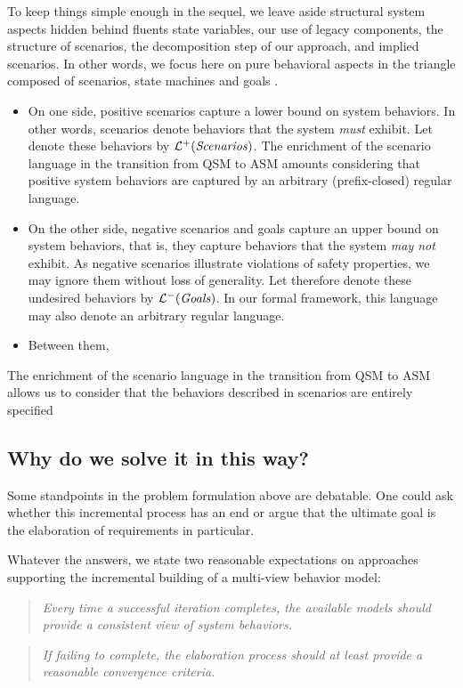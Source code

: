 To keep things simple enough in the sequel, we leave aside structural system aspects hidden behind fluents state variables, our use of legacy components, the structure of scenarios, the decomposition step of our approach, and implied scenarios. In other words, we focus here on pure behavioral aspects in the triangle composed of scenarios, state machines and goals \cite{Damas:2006, Uchitel:2007}.
\begin{itemize}
\item On one side, positive scenarios capture a lower bound on system behaviors. In other words, scenarios denote behaviors that the system \emph{must} exhibit. Let denote these behaviors by $\mathcal{L}^+(\mbox{\emph{Scenarios}})$. The enrichment of the scenario language in the transition from QSM to ASM amounts considering that positive system behaviors are captured by an arbitrary (prefix-closed) regular language.
\item On the other side, negative scenarios and goals capture an upper bound on system behaviors, that is, they capture behaviors that the system \emph{may not} exhibit. As negative scenarios illustrate violations of safety properties, we may ignore them without loss of generality. Let therefore denote these undesired behaviors by $\mathcal{L}^-(\mbox{\emph{Goals}})$. In our formal framework, this language may also denote an arbitrary regular language.
\item Between them, 
\end{itemize}

The enrichment of the scenario language in the transition from QSM to ASM allows us to consider that the behaviors described in scenarios are entirely specified 

\subsection{Why do we solve it in this way?}

Some standpoints in the problem formulation above are debatable. One could ask whether this incremental process has an end or argue that the ultimate goal is the elaboration of requirements in particular. 

Whatever the answers, we state two reasonable expectations on approaches supporting the incremental building of a multi-view behavior model:
\begin{quotation}
\emph{Every time a successful iteration completes, the available models should provide a consistent view of system behaviors.}
\end{quotation}
\begin{quotation}
\emph{If failing to complete, the elaboration process should at least provide a reasonable convergence criteria.}
\end{quotation}

